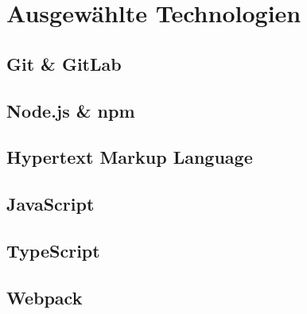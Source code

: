 \chapter{Ausgewählte Technologien}
\section{Git \& GitLab}

\section{Node.js \& npm}

\section{Hypertext Markup Language}

\section{JavaScript}

\section{TypeScript}

\section{Webpack}